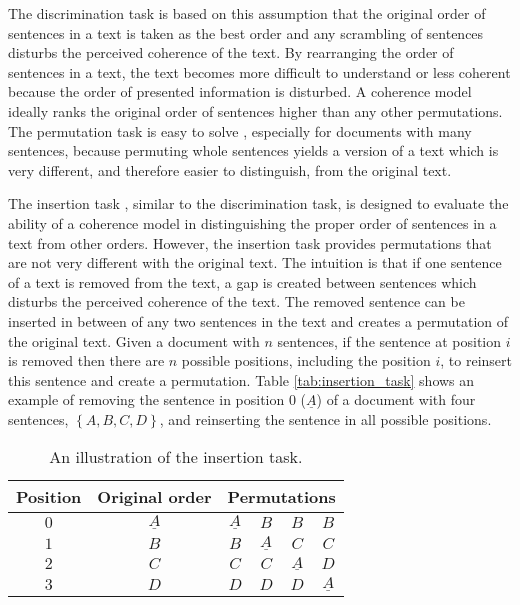The discrimination task is based on this assumption that the original order of sentences in a text is taken as the best order and any scrambling of sentences disturbs the perceived coherence of the text. 
By rearranging the order of sentences in a text, the text becomes more difficult to understand or less coherent because the order of presented information is disturbed. 
A coherence model ideally ranks the original order of sentences higher than any other permutations. 
The permutation task is easy to solve \cite{elsner11b}, especially for documents with many sentences, because permuting whole sentences yields a version of a text which is very different, and therefore easier to distinguish, from the original text. 

The insertion task \cite{barzilay05a}, similar to the discrimination task, is designed to evaluate the ability of a coherence model in distinguishing the proper order of sentences in a text from other orders. 
However, the insertion task provides permutations that are not very different with the original text. 
The intuition is that if one sentence of a text is removed from the text, a gap is created between sentences which disturbs the perceived coherence of the text.  
The removed sentence can be inserted in between of any two sentences in the text and creates a permutation of the original text.   
Given a document with $n$ sentences, if the sentence at position $i$ is removed then there are $n$ possible positions, including the position $i$, to reinsert this sentence and create a permutation. 
Table \ref{tab:insertion_task} shows an example of removing the sentence in position $0$ ($\underline{A}$) of a document with four sentences, $\left \{ A, B, C, D \right \}$, and reinserting the sentence in all possible positions. 

\begin{table}[!ht]
	\begin{center}
		\begin{tabular}{cc|cccc}
		\hline
		Position & Original order  & \multicolumn{4}{c}{Permutations}\\
		\hline
		$0$ & $\underline{A}$ & $\underline{A}$ & $B$ & $B$ & $B$\\
		$1$ & $B$ 			  & $B$  & $\underline{A}$ & $C$ & $C$\\
		$2$ & $C$			  & $C$ & $C$ & $\underline{A}$ & $D$\\
		$3$ & $D$			  & $D$ & $D$ & $D$ & $\underline{A}$\\
		\end{tabular}
	\end{center}
	\caption{An illustration of the insertion task. } 
	\label{table:insertion_task}  
\end{table}

